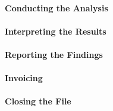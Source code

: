 \paragraph{Conducting the Analysis}
\paragraph{Interpreting the Results}
\paragraph{Reporting the Findings}
\paragraph{Invoicing}
\paragraph{Closing the File}